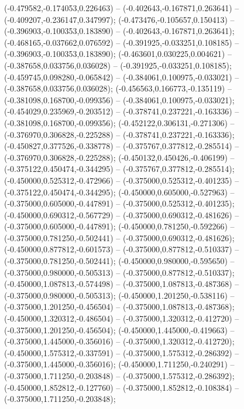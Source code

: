  (-0.479582,-0.174053,0.226463) -- (-0.402643,-0.167871,0.263641) -- (-0.409207,-0.236147,0.347997);
 (-0.473476,-0.105657,0.150413) -- (-0.396903,-0.100353,0.183890) -- (-0.402643,-0.167871,0.263641);
 (-0.468165,-0.037662,0.076592) -- (-0.391925,-0.033251,0.108185) -- (-0.396903,-0.100353,0.183890);
 (-0.463601,0.030225,0.004621) -- (-0.387658,0.033756,0.036028) -- (-0.391925,-0.033251,0.108185);
 (-0.459745,0.098280,-0.065842) -- (-0.384061,0.100975,-0.033021) -- (-0.387658,0.033756,0.036028);
 (-0.456563,0.166773,-0.135119) -- (-0.381098,0.168700,-0.099356) -- (-0.384061,0.100975,-0.033021);
 (-0.454029,0.235969,-0.203512) -- (-0.378741,0.237221,-0.163336) -- (-0.381098,0.168700,-0.099356);
 (-0.452122,0.306131,-0.271306) -- (-0.376970,0.306828,-0.225288) -- (-0.378741,0.237221,-0.163336);
 (-0.450827,0.377526,-0.338778) -- (-0.375767,0.377812,-0.285514) -- (-0.376970,0.306828,-0.225288);
 (-0.450132,0.450426,-0.406199) -- (-0.375122,0.450474,-0.344295) -- (-0.375767,0.377812,-0.285514);
 (-0.450000,0.525312,-0.472966) -- (-0.375000,0.525312,-0.401235) -- (-0.375122,0.450474,-0.344295);
 (-0.450000,0.605000,-0.527963) -- (-0.375000,0.605000,-0.447891) -- (-0.375000,0.525312,-0.401235);
 (-0.450000,0.690312,-0.567729) -- (-0.375000,0.690312,-0.481626) -- (-0.375000,0.605000,-0.447891);
 (-0.450000,0.781250,-0.592266) -- (-0.375000,0.781250,-0.502441) -- (-0.375000,0.690312,-0.481626);
 (-0.450000,0.877812,-0.601573) -- (-0.375000,0.877812,-0.510337) -- (-0.375000,0.781250,-0.502441);
 (-0.450000,0.980000,-0.595650) -- (-0.375000,0.980000,-0.505313) -- (-0.375000,0.877812,-0.510337);
 (-0.450000,1.087813,-0.574498) -- (-0.375000,1.087813,-0.487368) -- (-0.375000,0.980000,-0.505313);
 (-0.450000,1.201250,-0.538116) -- (-0.375000,1.201250,-0.456504) -- (-0.375000,1.087813,-0.487368);
 (-0.450000,1.320312,-0.486504) -- (-0.375000,1.320312,-0.412720) -- (-0.375000,1.201250,-0.456504);
 (-0.450000,1.445000,-0.419663) -- (-0.375000,1.445000,-0.356016) -- (-0.375000,1.320312,-0.412720);
 (-0.450000,1.575312,-0.337591) -- (-0.375000,1.575312,-0.286392) -- (-0.375000,1.445000,-0.356016);
 (-0.450000,1.711250,-0.240291) -- (-0.375000,1.711250,-0.203848) -- (-0.375000,1.575312,-0.286392);
 (-0.450000,1.852812,-0.127760) -- (-0.375000,1.852812,-0.108384) -- (-0.375000,1.711250,-0.203848);
